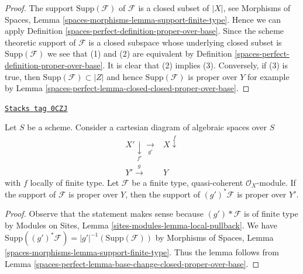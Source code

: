 \begin{proof}
The support $\text{Supp}(\mathcal{F})$ of $\mathcal{F}$ is a closed subset
of $|X|$, see Morphisms of Spaces, Lemma
\ref{spaces-morphisms-lemma-support-finite-type}.
Hence we can apply Definition \ref{spaces-perfect-definition-proper-over-base}.
Since the scheme theoretic support of $\mathcal{F}$ is a closed
subspace whose underlying closed subset is $\text{Supp}(\mathcal{F})$
we see that (1) and (2) are equivalent by
Definition \ref{spaces-perfect-definition-proper-over-base}.
It is clear that (2) implies (3).
Conversely, if (3) is true, then
$\text{Supp}(\mathcal{F}) \subset |Z|$
and hence $\text{Supp}(\mathcal{F})$
is proper over $Y$ for example by
Lemma \ref{spaces-perfect-lemma-closed-closed-proper-over-base}.
\end{proof}

\begin{lemma}
\label{spaces-perfect-lemma-base-change-module-support-proper-over-base}
\href{https://stacks.math.columbia.edu/tag/0CZJ}{\texttt{Stacks tag 0CZJ}}

Let $S$ be a scheme.
Consider a cartesian diagram of algebraic spaces over $S$
$$
\begin{array}{cc}X' \underset{f'}{\downarrow}\underset{g'}{\longrightarrow} & X \overset{f}{\downarrow} \\ Y' \overset{g}{\longrightarrow} & Y\end{array}
$$
with $f$ locally of finite type. Let $\mathcal{F}$ be a
finite type, quasi-coherent $\mathcal{O}_X$-module.
If the support of $\mathcal{F}$ is proper over $Y$, then
the support of $(g')^*\mathcal{F}$ is proper over $Y'$.
\end{lemma}

\begin{proof}
Observe that the statement makes sense because
$(g')*\mathcal{F}$ is of finite type by
Modules on Sites, Lemma \ref{sites-modules-lemma-local-pullback}.
We have $\text{Supp}((g')^*\mathcal{F}) = |g'|^{-1}(\text{Supp}(\mathcal{F}))$
by Morphisms of Spaces, Lemma \ref{spaces-morphisms-lemma-support-finite-type}.
Thus the lemma follows from
Lemma \ref{spaces-perfect-lemma-base-change-closed-proper-over-base}.
\end{proof}

